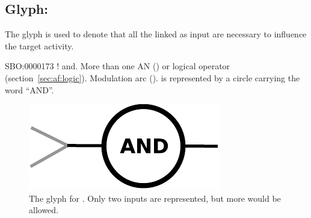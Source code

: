 \subsection{Glyph: }
\label{sec:af:and}

The glyph  is used to denote that all the  linked as input are necessary to influence the target activity.

\begin{glyphDescription}
 \glyphSboTerm SBO:0000173 ! and.
 \glyphOrigin More than one AN () or logical operator (section~\ref{sec:af:logic}).
 \glyphTarget  Modulation arc ().
 \glyphNode {} is represented by a circle carrying the word ``AND''.
\end{glyphDescription}

\begin{figure}[H]
  \centering
  \includegraphics[scale = 0.5]{images/and}
  \caption{The \AF glyph for . Only two inputs are represented, but more would be allowed.}
  \label{fig:af:and}
\end{figure}
